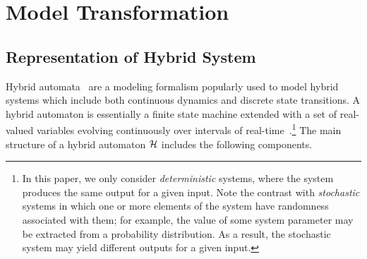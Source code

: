 %
%
%

\section{Model Transformation}
% 
\subsection{Representation of Hybrid System}
Hybrid automata~\cite{alur1995algorithmic} are a modeling formalism popularly used to model hybrid systems which include both continuous dynamics and discrete state transitions. A hybrid automaton is essentially a finite state machine extended with a set of real-valued variables evolving continuously over intervals of real-time~\cite{alur1995algorithmic}.\footnote{In this paper, we only consider \emph{deterministic} systems, where the system produces the same output for a given input. Note the contrast with {\em stochastic} systems in which one or more elements of the system have randomness associated with them; for example, the value of some system parameter may be extracted from a probability distribution. As a result, the stochastic system may yield different outputs for a given input.} 
%
The main structure of a hybrid automaton ${\mathcal H}$ includes the following components.
%
%
%
%
%

